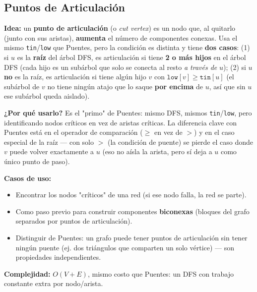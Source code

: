 \documentclass[10pt,a4paper,twocolumn]{article}
\begin{document}
\subsection{Puntos de Articulación}

\textbf{Idea:} un \textbf{punto de articulación} (o \textit{cut
	vertex}) es un nodo que, al quitarlo (junto con sus aristas),
\textbf{aumenta} el número de componentes conexas. Usa el mismo
\texttt{tin}/\texttt{low} que Puentes, pero la condición es distinta
y tiene \textbf{dos casos}: (1) si $u$ es la \textbf{raíz} del árbol
DFS, es articulación si tiene \textbf{2 o más hijos} en el árbol DFS
(cada hijo es un subárbol que solo se conecta al resto \textit{a
	través de} $u$); (2) si $u$ \textbf{no} es la raíz, es articulación
si tiene algún hijo $v$ con $\texttt{low}[v] \ge \texttt{tin}[u]$
(el subárbol de $v$ no tiene ningún atajo que lo saque \textbf{por
	encima} de $u$, así que sin $u$ ese subárbol queda aislado).

\textbf{¿Por qué usarlo?} Es el "primo" de Puentes: mismo DFS,
mismos \texttt{tin}/\texttt{low}, pero identificando nodos críticos
en vez de aristas críticas. La diferencia clave con Puentes está en
el operador de comparación ($\ge$ en vez de $>$) y en el caso especial
de la raíz — con solo $>$ (la condición de puente) se pierde el caso
donde $v$ puede volver exactamente a $u$ (eso no aísla la arista,
pero sí deja a $u$ como único punto de paso).

\textbf{Casos de uso:}

\begin{itemize}
	\item Encontrar los nodos "críticos" de una red (si ese nodo
	falla, la red se parte).
	\item Como paso previo para construir componentes
	\textbf{biconexas} (bloques del grafo separados por puntos de
	articulación).
	\item Distinguir de Puentes: un grafo puede tener puntos de
	articulación sin tener ningún puente (ej. dos triángulos que
	comparten un solo vértice) — son propiedades independientes.
\end{itemize}

\textbf{Complejidad:} $O(V + E)$, mismo costo que Puentes: un DFS con
trabajo constante extra por nodo/arista.
\end{document}
